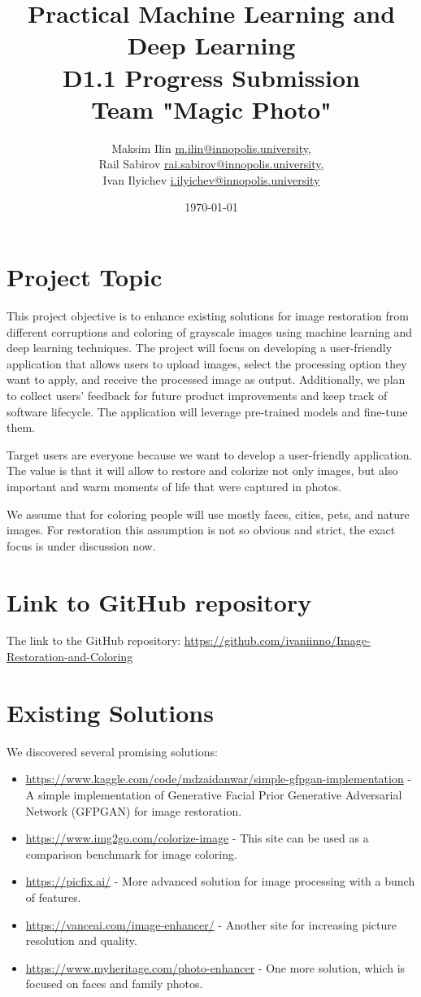 \documentclass{article}
\title{Practical Machine Learning and Deep Learning\\D1.1 Progress Submission\\
Team "Magic Photo"}
\author{Maksim Ilin \href{mailto:m.ilin@innopolis.university}{m.ilin@innopolis.university},\\ Rail Sabirov \href{mailto:rai.sabirov@innopolis.university}{rai.sabirov@innopolis.university},\\ Ivan Ilyichev \href{mailto:i.ilyichev@innopolis.university}{i.ilyichev@innopolis.university}}
\date{\today}
\begin{document}
\maketitle

\section{Project Topic}
\par This project objective is to enhance existing solutions for image restoration from different corruptions and coloring of grayscale images using machine learning and deep learning techniques. The project will focus on developing a user-friendly application that allows users to upload images, select the processing option they want to apply, and receive the processed image as output. Additionally, we plan to collect users' feedback for future product improvements and keep track of software lifecycle. The application will leverage pre-trained models and fine-tune them. 
\par Target users are everyone because we want to develop a user-friendly application. The value is that it will allow to restore and colorize not only images, but also important and warm moments of life that were captured in photos.
\par We assume that for coloring people will use mostly faces, cities, pets, and nature images. For restoration this assumption is not so obvious and strict, the exact focus is under discussion now.

\section{Link to GitHub repository}
\par The link to the GitHub repository: \url{https://github.com/ivaniinno/Image-Restoration-and-Coloring}

\section{Existing Solutions}
\par We discovered several promising solutions:
\begin{itemize}
    \item \url{https://www.kaggle.com/code/mdzaidanwar/simple-gfpgan-implementation} - A simple implementation of Generative Facial Prior Generative Adversarial Network (GFPGAN) for image restoration.
    \item \url{https://www.img2go.com/colorize-image} - This site can be used as a comparison benchmark for image coloring.
    \item \url{https://picfix.ai/} - More advanced solution for image processing with a bunch of features.
    \item \url{https://vanceai.com/image-enhancer/} - Another site for increasing picture resolution and quality.
    \item \url{https://www.myheritage.com/photo-enhancer} - One more solution, which is focused on faces and family photos.
\end{itemize}
\end{document}
